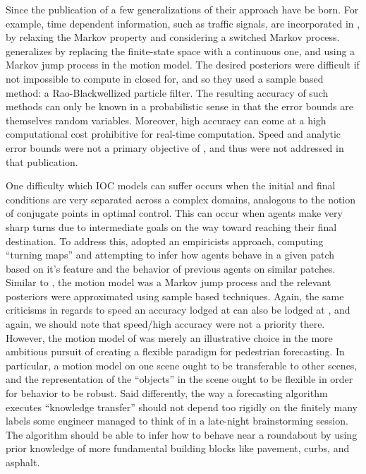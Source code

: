 \documentclass[conference]{IEEEtran}
\begin{document}
Since the publication of \cite{Kitani2012} a few generalizations of their approach have be born.
For example, time dependent information, such as traffic signals, are incorporated in \cite{Karasev2016}, by relaxing the Markov property and considering a switched Markov process.
\citet{Karasev2016} generalizes \cite{Kitani2012} by replacing the finite-state space with a continuous one, and using a Markov jump process in the motion model.
The desired posteriors were difficult if not impossible to compute in closed for, and so they used a sample based method: a Rao-Blackwellized particle filter\cite{Doucet2000}.
The resulting accuracy of such methods can only be known in a probabilistic sense in that the error bounds are themselves random variables.
Moreover, high accuracy can come at a high computational cost prohibitive for real-time computation.
Speed and analytic error bounds were not a primary objective of \cite{Karasev2016}, and thus were not addressed in that publication.


One difficulty which IOC models can suffer occurs when the initial and final conditions are very separated across a complex domains, analogous to the notion of conjugate points in optimal control.
This can occur when agents make very sharp turns due to intermediate goals on the way toward reaching their final destination.
To address this, \citet{Ballan2016} adopted an empiricists approach, computing ``turning maps'' and attempting to infer how agents behave in a given patch based on it's feature and the behavior of previous agents on similar patches.
Similar to \cite{Karasev2016}, the motion model was a Markov jump process and the relevant posteriors were approximated using sample based techniques.
Again, the same criticisms in regards to speed an accuracy lodged at \cite{Karasev2016} can also be lodged at \cite{Ballan2016}, and again, we should note that speed/high accuracy were not a priority there.
However, the motion model of \citet{Ballan2016} was merely an illustrative choice in the more ambitious pursuit of creating a flexible paradigm for pedestrian forecasting.
In particular, a motion model on one scene ought to be transferable to other scenes, and the representation of the ``objects'' in the scene ought to be flexible in order for behavior to be robust.
Said differently, the way a forecasting algorithm executes ``knowledge transfer'' should not depend too rigidly on the finitely many labels some engineer managed to think of in a late-night brainstorming session.
The algorithm should be able to infer how to behave near a roundabout by using prior knowledge of more fundamental building blocks like pavement, curbs, and asphalt.
\end{document}
